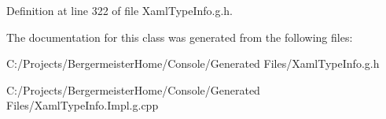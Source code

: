 Definition at line 322 of file Xaml\+Type\+Info.\+g.\+h.



The documentation for this class was generated from the following files\+:\begin{DoxyCompactItemize}
\item 
C\+:/\+Projects/\+Bergermeister\+Home/\+Console/\+Generated Files/Xaml\+Type\+Info.\+g.\+h\item 
C\+:/\+Projects/\+Bergermeister\+Home/\+Console/\+Generated Files/Xaml\+Type\+Info.\+Impl.\+g.\+cpp\end{DoxyCompactItemize}
